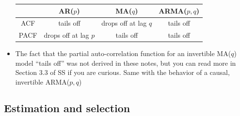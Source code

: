 \documentclass{article}
\begin{document}
\begin{itemize}
  \begin{center} \smallskip
  \begin{tabular}{|c|c|c|c|}
  \hline
  & AR($p$) & MA($q$) & ARMA($p,q$) \\
  \hline
  ACF & tails off & drops off at lag $q$ & tails off \\
  \hline
  PACF & drops off at lag $p$ & tails off & tails off \\
  \hline
  \end{tabular} \smallskip
  \end{center}

\item The fact that the partial auto-correlation function for an invertible
  MA($q$) model ``tails off'' was not derived in these notes, but you can read
  more in Section 3.3 of SS if you are curious. Same with the behavior of a
  causal, invertible ARMA($p,q$) 
\end{itemize}

\subsection{Estimation and selection}
\end{document}
